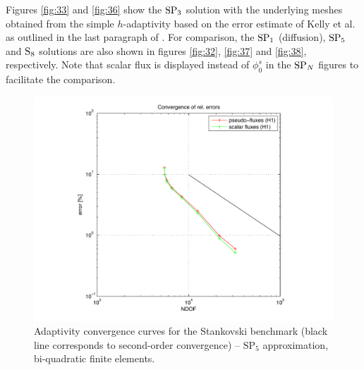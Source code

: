 Figures \ref{fig:33} and \ref{fig:36} show the $\SPN[3]$ solution with the underlying meshes obtained from the simple
$h$-adaptivity based on the error estimate of Kelly et al. as outlined in the last paragraph of .
For comparison,
the $\SPN[1]$ (diffusion), $\SPN[5]$ and $\SN[8]$ solutions are also shown in figures \ref{fig:32}, \ref{fig:37} and 
\ref{fig:38}, respectively.
Note that scalar flux is displayed instead of $\phi_0^s$ in the $\SPN$ figures
to facilitate the comparison.



\begin{figure}[!ht]
\centering
  \includegraphics[scale=.45]{stankov/conv_dof_sp5}
  \caption[Adaptivity convergence curves for the Stankovski benchmark ]{Adaptivity convergence curves for the 
  Stankovski benchmark (black line corresponds to second-order convergence) -- $\text{SP}_5$ approximation,
  bi-quadratic finite elements.}
  \label{fig:39}
\end{figure}


